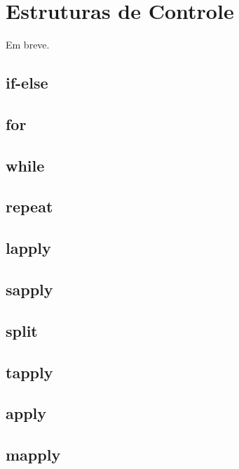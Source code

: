 \documentclass[]{book}
\theoremstyle{definition}
\theoremstyle{definition}
\theoremstyle{definition}
\theoremstyle{remark}
\begin{document}
\chapter{Estruturas de Controle}\label{loop}

Em breve.

\section{if-else}\label{if-else}

\section{for}\label{for}

\section{while}\label{while}

\section{repeat}\label{repeat}

\section{lapply}\label{lapply}

\section{sapply}\label{sapply}

\section{split}\label{split}

\section{tapply}\label{tapply}

\section{apply}\label{apply}

\section{mapply}\label{mapply}
\end{document}
